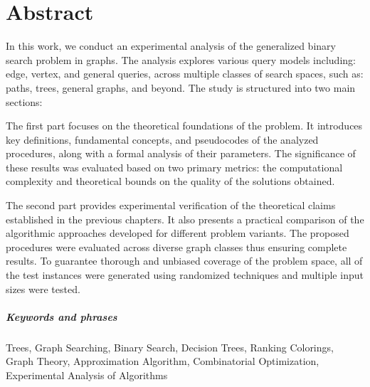 \chapter*{Abstract}

In this work, we conduct an experimental analysis of the generalized binary search problem in graphs. The analysis explores various query models including: edge, vertex, and general queries, across multiple classes of search spaces, such as: paths, trees, general graphs, and beyond. The study is structured into two main sections:

The first part focuses on the theoretical foundations of the problem. It introduces key definitions, fundamental concepts, and pseudocodes of the analyzed procedures, along with a formal analysis of their parameters. The significance of these results was evaluated based on two primary metrics: the computational complexity and theoretical bounds on the quality of the solutions obtained.

The second part provides experimental verification of the theoretical claims established in the previous chapters. It also presents a practical comparison of the algorithmic approaches developed for different problem variants. The proposed procedures were evaluated across diverse graph classes thus ensuring complete results. To guarantee thorough and unbiased coverage of the problem space, all of the test instances were generated using randomized techniques and multiple input sizes were tested.

\paragraph{Keywords and phrases} Trees, Graph Searching, Binary Search, Decision Trees, Ranking Colorings, Graph
Theory, Approximation Algorithm, Combinatorial Optimization, Experimental Analysis of Algorithms
